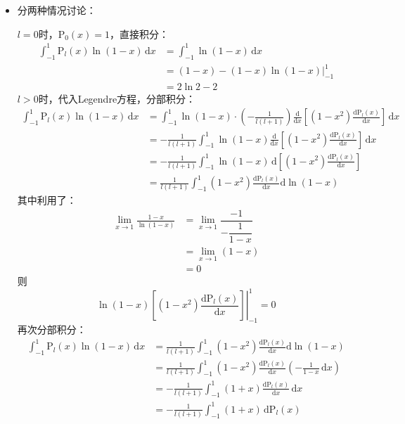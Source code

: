 \documentclass[fontset=windows]{ctexart}
\begin{document}
\begin{itemize}
    \item[3.(1)]
    分两种情况讨论：

    $l=0$时，$\mathrm{P}_0(x) = 1$，直接积分：
    \begin{align*}
        \int_{-1}^{1}\mathrm{P}_l(x)\ln(1-x)\,\mathrm{d}x
        &= \int_{-1}^{1}\ln(1-x)\,\mathrm{d}x \\
        &= \left.(1-x)-(1-x)\ln(1-x)\right|_{-1}^{1} \\
        &= 2\ln2-2
    \end{align*}
    $l>0$时，代入Legendre方程，分部积分：
    \begin{align*}
        \int_{-1}^{1}\mathrm{P}_l(x)\ln(1-x)\,\mathrm{d}x
        &= \int_{-1}^{1}\ln(1-x)\cdot\left(-\frac{1}{l(l+1)}\right)\frac{\mathrm{d}}{\mathrm{d}x}\left[(1-x^2)\frac{\mathrm{d}\mathrm{P}_l(x)}{\mathrm{d}x}\right]\,\mathrm{d}x \\
        &= -\frac{1}{l(l+1)}\int_{-1}^{1}\ln(1-x)\frac{\mathrm{d}}{\mathrm{d}x}\left[(1-x^2)\frac{\mathrm{d}\mathrm{P}_l(x)}{\mathrm{d}x}\right]\,\mathrm{d}x \\
        &= -\frac{1}{l(l+1)}\int_{-1}^{1}\ln(1-x)\,\mathrm{d}\left[(1-x^2)\frac{\mathrm{d}\mathrm{P}_l(x)}{\mathrm{d}x}\right] \\
        &= \frac{1}{l(l+1)}\int_{-1}^{1}(1-x^2)\frac{\mathrm{d}\mathrm{P}_l(x)}{\mathrm{d}x}\mathrm{d}\ln(1-x)
    \end{align*}
    其中利用了：
    \begin{align*}
        \lim_{x\to1}\frac{1-x}{\ln(1-x)}
        &= \lim_{x\to1}\dfrac{-1}{-\dfrac{1}{1-x}} \\
        &= \lim_{x\to1}(1-x) \\
        &= 0
    \end{align*}
    则
    \[
    \left.\ln(1-x)\left[(1-x^2)\frac{\mathrm{d}\mathrm{P}_l(x)}{\mathrm{d}x}\right]\right|_{-1}^{1} = 0
    \]
    再次分部积分：
    \begin{align*}
        \int_{-1}^{1}\mathrm{P}_l(x)\ln(1-x)\,\mathrm{d}x
        &= \frac{1}{l(l+1)}\int_{-1}^{1}(1-x^2)\frac{\mathrm{d}\mathrm{P}_l(x)}{\mathrm{d}x}\mathrm{d}\ln(1-x) \\
        &= \frac{1}{l(l+1)}\int_{-1}^{1}(1-x^2)\frac{\mathrm{d}\mathrm{P}_l(x)}{\mathrm{d}x}\left(-\frac{1}{1-x}\,\mathrm{d}x\right) \\
        &= -\frac{1}{l(l+1)}\int_{-1}^{1}(1+x)\frac{\mathrm{d}\mathrm{P}_l(x)}{\mathrm{d}x}\,\mathrm{d}x \\
        &= -\frac{1}{l(l+1)}\int_{-1}^{1}(1+x)\,\mathrm{d}\mathrm{P}_l(x) \\

\end{align*}
\end{itemize}
\end{document}
